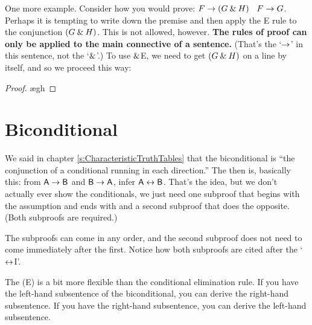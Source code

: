 One more example. Consider how you would prove: $F\rightarrow(G\mathbin{\&} H)$ \therefore\ $F\rightarrow G$. Perhaps it is tempting to write down the premise and then apply the {\eand}E rule to the conjunction $(G \mathbin{\&} H)$. This is not allowed, however. \textbf{The rules of proof can only be applied to the main connective of a sentence.} (That's the `$\rightarrow$' in this sentence, not the `$\mathbin{\&}$'.) To use $\mathbin{\&}$E, we need to get $(G \mathbin{\&} H)$ on a line by itself, and so we proceed this way:

\begin{proof}
	 
	\open
		\ae{gh}
	\close
\end{proof}


\section{Biconditional}
We said in chapter \ref{s:CharacteristicTruthTables} that the biconditional is ``the conjunction of a conditional running in each direction.'' The  then is, basically this: from $\mathsf{A} \rightarrow \mathsf{B}$ and $\mathsf{B} \rightarrow \mathsf{A}$, infer $\mathsf{A} \leftrightarrow \mathsf{B}$. That's the idea, but we don't actually ever show the conditionals, we just need one subproof that begins with the assumption  and ends with  and a second subproof that does the opposite. (Both subproofs are required.)

The subproofs can come in any order, and the second subproof does not need to come immediately after the first. Notice how both subproofs are cited after the `$\leftrightarrow$I'.

The  ({\eiff}E) is a bit more flexible than the conditional elimination rule. If you have the left-hand subsentence of the biconditional, you can derive the right-hand subsentence. If you have the right-hand subsentence, you can derive the left-hand subsentence.
\factoidbox{
\begin{proof}
	\have[m]{ab}{\meta{A}\eiff\meta{B}}
	\have[n]{a}{\meta{A}}
	\have[\ ]{b}{\meta{B}} \be{ab,a}
\end{proof}
\begin{proof}
	\have[m]{ab}{\meta{A}\eiff\meta{B}}
	\have[n]{a}{\meta{B}}
	\have[\ ]{b}{\meta{A}} \be{ab,a}
\end{proof}}


